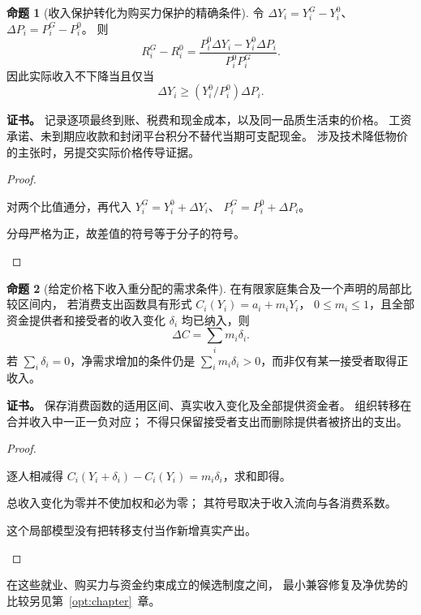\documentclass[UTF8,12pt,a4paper,openany,fontset=none,zihao=false]{ctexrep}
\theoremstyle{definition}
\newtheorem{proposition}{命题}[chapter]
\newenvironment{certificate}{\par\noindent\textbf{证书。}\ignorespaces}{\par}
\newcommand{\1}{\mathbf 1}
\begin{document}
\begin{proposition}[收入保护转化为购买力保护的精确条件]
\label{lab:prop-real-income}
令 \(\Delta Y_i=Y_i^G-Y_i^0\)、
\(\Delta P_i=P_i^G-P_i^0\)。
则
\[
 R_i^G-R_i^0
 =\frac{P_i^0\Delta Y_i-Y_i^0\Delta P_i}{P_i^0P_i^G}.
\]
因此实际收入不下降当且仅当
\[
 \Delta Y_i\ge (Y_i^0/P_i^0)\Delta P_i.
\]
\end{proposition}
\begin{certificate}
记录逐项最终到账、税费和现金成本，以及同一品质生活束的价格。
工资承诺、未到期应收款和封闭平台积分不替代当期可支配现金。
涉及技术降低物价的主张时，另提交实际价格传导证据。
\end{certificate}
\begin{proof}
\begin{semanticsteps}
\item 对两个比值通分，再代入
\(Y_i^G=Y_i^0+\Delta Y_i\)、
\(P_i^G=P_i^0+\Delta P_i\)。
\item 分母严格为正，故差值的符号等于分子的符号。
\end{semanticsteps}
\end{proof}

\begin{proposition}[给定价格下收入重分配的需求条件]
\label{lab:prop-demand-transfer}
在有限家庭集合及一个声明的局部比较区间内，
若消费支出函数具有形式 \(C_i(Y_i)=a_i+m_iY_i\)，
\(0\le m_i\le1\)，且全部资金提供者和接受者的收入变化
\(\delta_i\) 均已纳入，则
\[
 \Delta C=\sum_i m_i\delta_i.
\]
若 \(\sum_i\delta_i=0\)，净需求增加的条件仍是
\(\sum_i m_i\delta_i>0\)，而非仅有某一接受者取得正收入。
\end{proposition}
\begin{certificate}
保存消费函数的适用区间、真实收入变化及全部提供资金者。
组织转移在合并收入中一正一负对应；
不得只保留接受者支出而删除提供者被挤出的支出。
\end{certificate}
\begin{proof}
\begin{semanticsteps}
\item 逐人相减得
\(C_i(Y_i+\delta_i)-C_i(Y_i)=m_i\delta_i\)，求和即得。
\item 总收入变化为零并不使加权和必为零；
其符号取决于收入流向与各消费系数。
\item 这个局部模型没有把转移支付当作新增真实产出。
\end{semanticsteps}
\end{proof}

在这些就业、购买力与资金约束成立的候选制度之间，
最小兼容修复及净优势的比较另见第~\ref{opt:chapter}~章。
\end{document}

